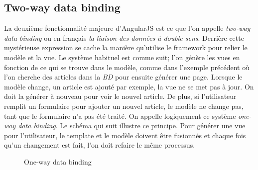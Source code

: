 \documentclass[a4paper,10pt,twoside]{sphinxmanual}
\begin{document}
\subsection{Two-way data binding}
\label{angularjs:two-way-data-binding}
La deuxième fonctionnalité majeure d'AngularJS est ce que l'on appelle \emph{two-way data binding} ou en français \emph{la liaison des données à double sens}. Derrière cette mystérieuse expression se cache la manière qu'utilise le framework pour relier le modèle et la vue. Le système habituel est comme suit; l'on génère les vues en fonction de ce qui se trouve dans le modèle, comme dans l'exemple précédent où l'on cherche des articles dans la \emph{BD} pour ensuite générer une page. Lorsque le modèle change, un article est ajouté par exemple, la vue ne se met pas à jour. On doit la générer à nouveau pour voir le nouvel article. De plus, si l'utilisateur remplit un formulaire pour ajouter un nouvel article, le modèle ne change pas, tant que le formulaire n'a pas été traité. On appelle logiquement ce système \emph{one-way data binding}. Le schéma qui suit illustre ce principe. Pour générer une vue pour l'utilisateur, le template et le modèle doivent être fusionnés et chaque fois qu'un changement est fait, l'on doit refaire le même processus.
\begin{figure}[htbp]
\centering
\capstart

\caption{One-way data binding}\end{figure}
\end{document}
